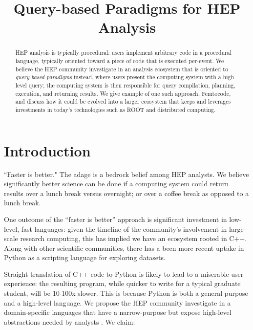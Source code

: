 \documentclass{article}
\begin{document}
\title{Query-based Paradigms for HEP Analysis}

\maketitle

\begin{abstract}
HEP analysis is typically procedural: users implement arbitrary code in a procedural language, typically oriented toward a piece of code that is executed per-event. We believe the HEP community investigate in an analysis ecosystem that is oriented to \textit{query-based paradigms} instead, where users present the computing system with a high-level query; the computing system is then responsible for query compilation, planning, execution, and returning results. We give example of one such approach, Femtocode, and discuss how it could be evolved into a larger ecosystem that keeps and leverages investments in today's technologies such as ROOT and distributed computing.
\end{abstract}

\section{Introduction}

``Faster is better." The adage is a bedrock belief among HEP analysts. We believe significantly better science can be done if a computing system could return results over a lunch break versus overnight; or over a coffee break as opposed to a lunch break.

One outcome of the ``faster is better'' approach is significant investment in low-level, fast languages: given the timeline of the community's involvement in large-scale research computing, this has implied we have an ecosystem rooted in C++. Along with other scientific communities, there has a been more recent uptake in Python as a scripting language for exploring datasets.

Straight translation of C++ code to Python is likely to lead to a miserable user experience: the resulting program, while quicker to write for a typical graduate student, will be 10-100x slower. This is because Python is both a general purpose and a high-level language. We propose the HEP community investigate in a domain-specific languages that have a narrow-purpose but expose high-level abstractions needed by analysts \footnotemark. We claim:

\end{document}
